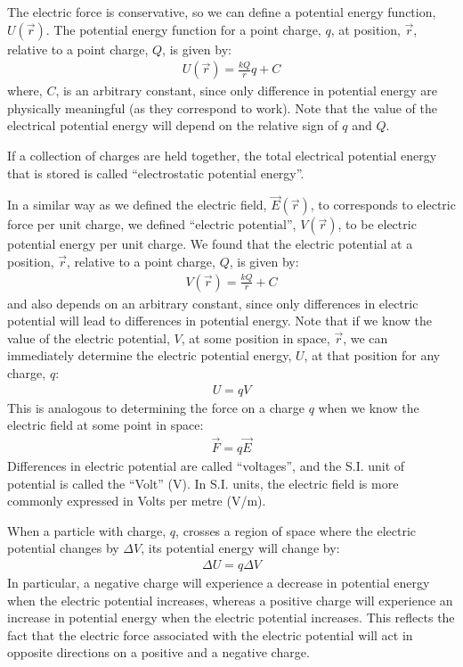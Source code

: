 \begin{chapterSummary}
The electric force is conservative, so we can define a potential energy function, $U(\vec r)$. The potential energy function for a point charge, $q$, at position, $\vec r$, relative to a point charge, $Q$, is given by:
\begin{align*}
U(\vec r) = \frac{kQ}{r}q + C
\end{align*}
where, $C$, is an arbitrary constant, since only difference in potential energy are physically meaningful (as they correspond to work). Note that the value of the electrical potential energy will depend on the relative sign of $q$ and $Q$. 

If a collection of charges are held together, the total electrical potential energy that is stored is called ``electrostatic potential energy''. 

In a similar way as we defined the electric field, $\vec E(\vec r)$, to corresponds to electric force per unit charge, we defined ``electric potential'', $V(\vec r)$, to be electric potential energy per unit charge. We found that the electric potential at a position, $\vec r$, relative to a point charge, $Q$, is given by:
\begin{align*}
V(\vec r) = \frac{kQ}{r} + C
\end{align*}
and also depends on an arbitrary constant, since only differences in electric potential will lead to differences in potential energy. Note that if we know the value of the electric potential, $V$, at some position in space, $\vec r$, we can immediately determine the electric potential energy, $U$, at that position for any charge, $q$:
\begin{align*}
U = qV
\end{align*}
This is analogous to determining the force on a charge $q$ when we know the electric field at some point in space:
\begin{align*}
\vec F = q \vec E
\end{align*}
Differences in electric potential are called ``voltages'', and the S.I. unit of potential is called the ``Volt'' (V). In S.I. units, the electric field is more commonly expressed in Volts per metre (V/m).

When a particle with charge, $q$, crosses a region of space where the electric potential changes by $\Delta V$, its potential energy will change by:
\begin{align*}
\Delta U = q\Delta V
\end{align*}
In particular, a negative charge will experience a decrease in potential energy when the electric potential increases, whereas a positive charge will experience an increase in potential energy when the electric potential increases. This reflects the fact that the electric force associated with the electric potential will act in opposite directions on a positive and a negative charge. 


\end{chapterSummary}
